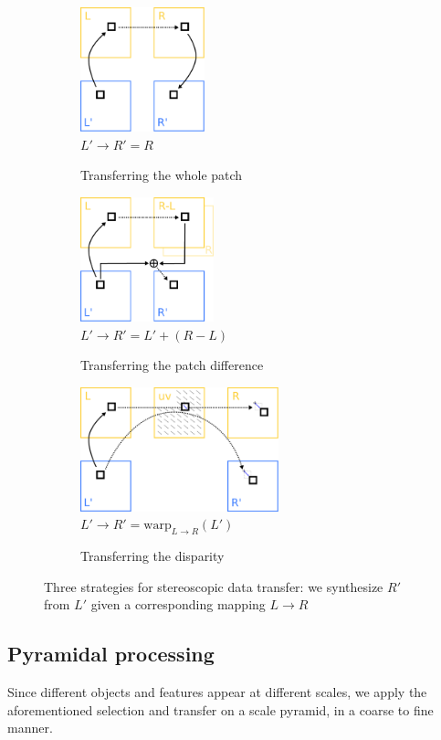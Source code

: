 \begin{figure}[ht!]
	\centering
	\begin{subfigure}[b]{0.29\textwidth}
	\centering
		\includegraphics[height=3.6cm]{figures/transfers-A}
		\\
		$L' \to R'=R\phantom{)}$
		\caption{Transferring the whole patch}
	\end{subfigure}
	\begin{subfigure}[b]{0.29\textwidth}
	\centering
		\includegraphics[height=3.6cm]{figures/transfers-B}
		\\
		$L' \to R'=L'+(R-L)$
		\caption{Transferring the patch difference}
	\end{subfigure}
	\begin{subfigure}[b]{0.4\textwidth}
	\centering
		\includegraphics[height=3.6cm]{figures/transfers-C}
		\\
		$L' \to R'=\textrm{warp}_{L\to R}(L')$
		\caption{Transferring the disparity}
	\end{subfigure}
	\caption{Three strategies for stereoscopic data transfer: we synthesize $R'$ from $L'$ given a corresponding mapping $L\to R$}
	\label{fig:transfers}
\end{figure}

\subsection{Pyramidal processing}
Since different objects and features appear at different scales, we apply the aforementioned selection and transfer on a scale pyramid, in a coarse to fine manner.

